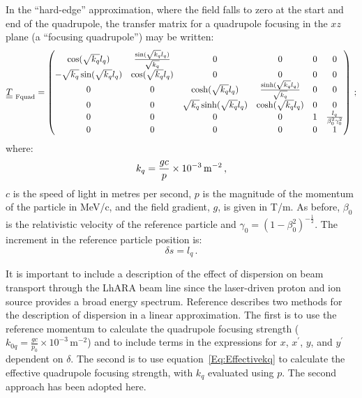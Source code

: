 In the ``hard-edge'' approximation, where the field falls to zero at
the start and end of the quadrupole, the transfer matrix for a
quadrupole focusing in the $xz$ plane (a ``focusing quadrupole'') may
be written: 
\begin{equation}
  \underline{\underline{T}}_{\rm~Fquad} =
    \begin{pmatrix}
          \cos(\sqrt{k_q} l_q) & \frac{\sin(\sqrt{k_q} l_q)}{\sqrt{k_q}} & 0 & 0             & 0 & 0 \\
-\sqrt{k_q} \sin(\sqrt{k_q} l_q) &                  \cos(\sqrt{k_q} l_q) & 0 & 0             & 0 & 0 \\
          0 & 0 &           \cosh(\sqrt{k_q} l_q) & \frac{\sinh(\sqrt{k_q} l_q)}{\sqrt{k_q}} & 0 & 0 \\
          0 & 0 &  \sqrt{k_q} \sinh(\sqrt{k_q} l_q) &                  \cosh(\sqrt{k_q} l_q) & 0 & 0 \\
          0 & 0 & 0 & 0 & 1 & \frac{l_q}{\beta_0^2 \gamma_0^2} \\
          0 & 0 & 0 & 0 & 0 &                             1
        \end{pmatrix} \, ; 
\end{equation}
where:
\begin{equation}
  k_q = \frac{gc}{p} \times 10^{-3} \, {\rm m}^{-2} \, ,
                                                   \label{Eq:Effectivekq}
\end{equation}
$c$ is the speed of light in metres per second, $p$ is the magnitude
of the momentum of the particle in MeV/c, and the field gradient, $g$,
is given in T/m. 
As before, $\beta_0$ is the relativistic velocity of the reference
particle and $\gamma_0=(1-\beta_0^2)^{-\frac{1}{2}}$.
The increment in the reference particle position is:
\begin{equation}
  \delta s = l_q \, .
\end{equation}

It is important to include a description of the effect of dispersion
on beam transport through the LhARA beam line since the laser-driven
proton and ion source provides a broad energy spectrum. 
Reference \cite{Wolski:2014} describes two methods for the description
of dispersion in a linear approximation.
The first is to use the reference momentum to calculate the quadrupole
focusing strength ($k_{0q} = \frac{gc}{p_0} \times 10^{-3}$\,m$^{-2}$)
and to include terms in the expressions for $x$, $x^\prime$, $y$, and
$y^\prime$ dependent on $\delta$.    
The second is to use equation~\ref{Eq:Effectivekq} to calculate the
effective quadrupole focusing strength, with $k_q$ evaluated using
$p$.
The second approach has been adopted here.

